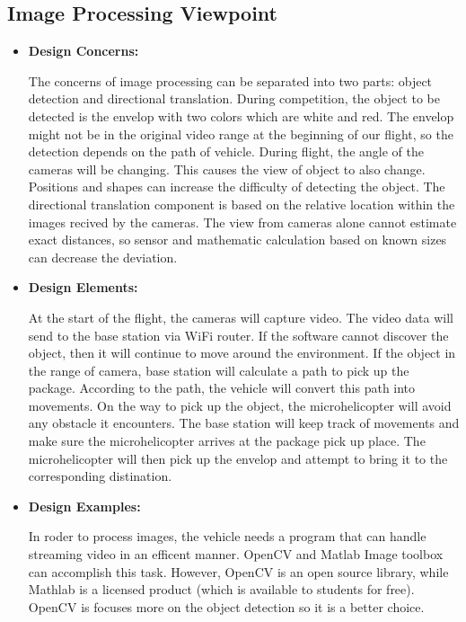 \documentclass[onecolumn, draftclsnofoot,10pt, compsoc]{IEEEtran}
\begin{document}
\subsection{Image Processing Viewpoint}
\begin{itemize}
\item{ \textbf{Design Concerns:}}

The concerns of image processing can be separated into two parts: object detection and directional translation. During competition, the object to be detected is the envelop with two colors which are white and red. The envelop might not be in the original video range at the beginning of our flight, so the detection depends on the path of vehicle. During flight, the angle of the cameras will be changing. This causes the view of object to also change. Positions and shapes can increase the difficulty of detecting the object. The directional translation component is based on the relative location within the images recived by the cameras. The view from cameras alone cannot estimate exact distances, so sensor and mathematic calculation based on known sizes can decrease the deviation. \\

\item{ \textbf{Design Elements:}}

At the start of the flight, the cameras will capture video. The video data will send to the base station via WiFi router. If the software cannot discover the object, then it will continue to move around the environment. If the object in the range of camera, base station will calculate a path to pick up the package. According to the path, the vehicle will convert this path into movements. On the way to pick up the object, the microhelicopter will avoid any obstacle it encounters. The base station will keep track of movements and make sure the microhelicopter arrives at the package pick up place. The microhelicopter will then pick up the envelop and attempt to bring it to the corresponding distination. \\ 
\item{ \textbf{Design Examples:}} %

In roder to process images, the vehicle needs a program that can handle streaming video in an efficent manner. OpenCV and Matlab Image toolbox can accomplish this task. However, OpenCV is an open source library, while Mathlab is a licensed product (which is available to students for free). OpenCV is focuses more on the object detection so it is a better choice.\\
\end{itemize}
\end{document}
